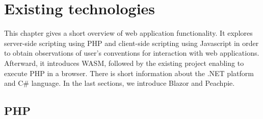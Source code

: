 \chapter{Existing technologies}

This chapter gives a short overview of web application functionality. 
It explores server-side scripting using PHP and client-side scripting using Javascript in order to obtain observations of user's conventions for interaction with web applications.
Afterward, it introduces WASM, followed by the existing project enabling to execute PHP in a browser.
There is short information about the .NET platform and C\# language.
In the last sections, we introduce Blazor and Peachpie.

\section{PHP}

